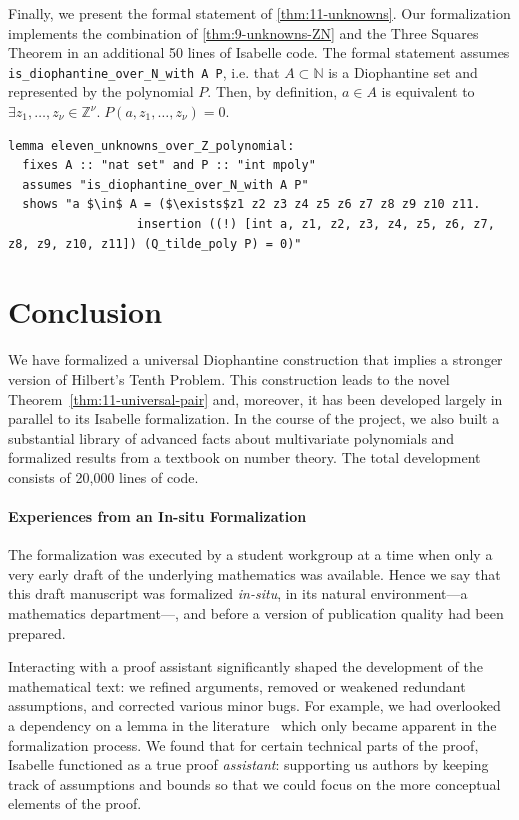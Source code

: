 \documentclass[a4paper,USenglish,cleveref,autoref,thm-restate]{lipics-v2021}
\newcommand{\N}{{\mathbb N}}
\newcommand{\Z}{{\mathbb Z}}
\begin{document}
Finally, we present the formal statement of \cref{thm:11-unknowns}. Our formalization implements the combination of \cref{thm:9-unknowns-ZN} and the Three Squares Theorem in an additional 50 lines of Isabelle code. The formal statement assumes \lstinline{is_diophantine_over_N_with A P}, i.e. that $A \subset \N$ is a Diophantine set and represented by the polynomial $P$. Then, by definition, $a \in A$ is equivalent to $\exists z_1, \ldots, z_\nu \in \Z^\nu. \; P(a, z_1, \ldots, z_\nu) = 0$.

\begin{lstlisting}[breaklines=true]
lemma eleven_unknowns_over_Z_polynomial: 
  fixes A :: "nat set" and P :: "int mpoly"
  assumes "is_diophantine_over_N_with A P"
  shows "a $\in$ A = ($\exists$z1 z2 z3 z4 z5 z6 z7 z8 z9 z10 z11.
                  insertion ((!) [int a, z1, z2, z3, z4, z5, z6, z7, z8, z9, z10, z11]) (Q_tilde_poly P) = 0)"
\end{lstlisting}

\section{Conclusion}

We have formalized a universal Diophantine construction that implies a stronger version of Hilbert's Tenth Problem. This construction leads to the novel Theorem~\ref{thm:11-universal-pair} and, moreover, it has been developed largely in parallel to its Isabelle formalization. In the course of the project, we also built a substantial library of advanced facts about multivariate polynomials and formalized results from a textbook on number theory. The total development consists of 20,000 lines of code.

\paragraph*{Experiences from an In-situ Formalization}
The formalization was executed by a student workgroup at a time when only a very early draft of the underlying mathematics was available. Hence we say that this draft manuscript was formalized \emph{in-situ}, in its natural environment---a mathematics department---, and before a version of publication quality had been prepared.

Interacting with a proof assistant significantly shaped the development of the mathematical text: we refined arguments, removed or weakened redundant assumptions, and corrected various minor bugs. For example, we had overlooked a dependency on a lemma in the literature~\cite[Lemma 10]{SunDFI} which only became apparent in the formalization process. We found that for certain technical parts of the proof, Isabelle functioned as a true proof \textit{assistant}: supporting us authors by keeping track of assumptions and bounds so that we could focus on the more conceptual elements of the proof.
\end{document}

